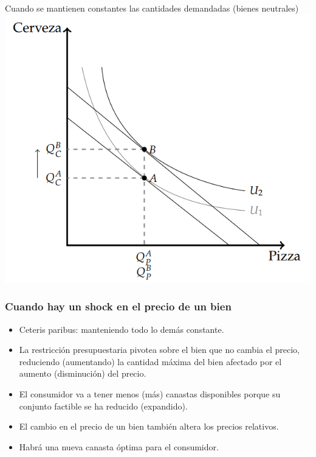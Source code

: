 \documentclass{beamer}
\begin{document}
\begin{frame}{Cuando se mantienen constantes las cantidades demandadas (bienes neutrales)}
    \centering
    \includegraphics[scale=0.5]{../Figures/C.8.6.png}
\end{frame}

\begin{frame}
\frametitle{Cuando hay un shock en el precio de un bien}
\begin{itemize}
    \item Ceteris paribus: manteniendo todo lo demás constante.
    \item La restricción presupuestaria pivotea sobre el bien que no cambia el precio, reduciendo (aumentando) la cantidad máxima del bien afectado por el aumento (disminución) del precio.  
    \item El consumidor va a tener menos (más) canastas disponibles porque su conjunto factible se ha reducido (expandido).
    \item El cambio en el precio de un bien también altera los precios relativos. 
    \item Habrá una nueva canasta óptima para el consumidor.
\end{itemize}
\end{frame}
\end{document}
